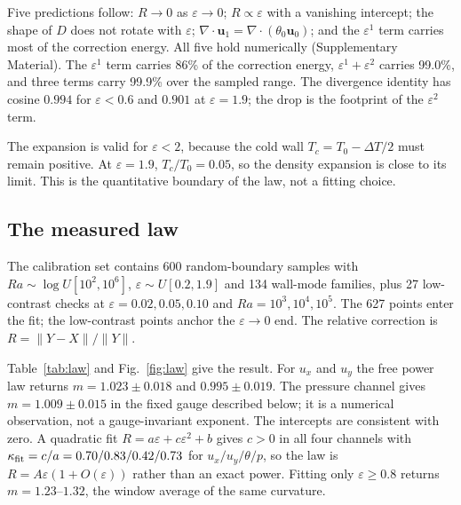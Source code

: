 \documentclass[preprint,11pt,a4paper,times,doubleblind]{elsarticle}
\begin{document}
Five predictions follow: $R\to0$ as $\varepsilon\to0$; $R\propto\varepsilon$ with a vanishing
intercept; the shape of $D$ does not rotate with $\varepsilon$;
$\nabla\cdot\bm u_1=\nabla\cdot(\theta_0\bm u_0)$; and the $\varepsilon^1$ term carries most
of the correction energy. All five hold numerically (Supplementary Material). The
$\varepsilon^1$ term carries 86\% of the correction energy, $\varepsilon^1+\varepsilon^2$
carries 99.0\%, and three terms carry 99.9\% over the sampled range. The divergence identity
has cosine $0.994$ for $\varepsilon<0.6$ and $0.901$ at $\varepsilon=1.9$; the drop is the
footprint of the $\varepsilon^2$ term.

The expansion is valid for $\varepsilon<2$, because the cold wall
$T_c=T_0-\Delta T/2$ must remain positive. At $\varepsilon=1.9$, $T_c/T_0=0.05$, so the
density expansion is close to its limit. This is the quantitative boundary of the law, not a
fitting choice.

\subsection{The measured law}
\label{sec:law}

The calibration set contains 600 random-boundary samples with
$Ra\sim\log U[10^2,10^6]$, $\varepsilon\sim U[0.2,1.9]$ and 134 wall-mode families, plus 27
low-contrast checks at $\varepsilon=0.02,0.05,0.10$ and $Ra=10^3,10^4,10^5$. The 627 points
enter the fit; the low-contrast points anchor the $\varepsilon\to0$ end. The relative
correction is $R=\|Y-X\|/\|Y\|$.

Table~\ref{tab:law} and Fig.~\ref{fig:law} give the result. For $u_x$ and $u_y$ the free
power law returns $m=1.023\pm0.018$ and $0.995\pm0.019$. The pressure channel gives
$m=1.009\pm0.015$ in the fixed gauge described below; it is a numerical observation, not a
gauge-invariant exponent. The intercepts are consistent with zero. A quadratic fit
$R=a\varepsilon+c\varepsilon^2+b$ gives $c>0$ in all four channels with
$\kappa_{\rm fit}=c/a=0.70/0.83/0.42/0.73$ for $u_x/u_y/\theta/p$, so the law is
$R=A\varepsilon(1+O(\varepsilon))$ rather than an exact power. Fitting only
$\varepsilon\ge0.8$ returns $m=1.23$--$1.32$, the window average of the same curvature.
\end{document}
